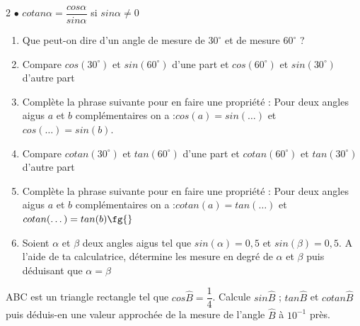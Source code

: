 \begin{multicols}{2}
{  		$\bullet$ $cotan\alpha=\dfrac{cos\alpha}{sin\alpha}$ si $sin\alpha\neq 0$
  	}
  	\begin{enumerate}
  		\item Que peut-on dire d'un angle de mesure de $ 30^\circ  $ et de mesure $ 60^\circ $ ?
  		\item Compare $cos(30^\circ) $ et $sin(60^\circ)  $ d'une part et $cos(60^\circ) $ et $sin(30^\circ)  $ d'autre part
  		\item Complète la phrase suivante pour en faire une propriété : \og Pour deux angles aigus $ a $ et $ b $ complémentaires on a :$cos(a) =sin(\dots)  $  et $cos( \dots ) =sin(b)  $. \fg{}
  		\item Compare $cotan(30^\circ) $ et $tan(60^\circ)  $ d'une part et $cotan(60^\circ) $ et $tan(30^\circ)  $ d'autre part
  		\item Complète la phrase suivante pour en faire une propriété : \og Pour deux angles aigus $ a $ et $ b $ complémentaires on a :$cotan(a) =tan(\dots)  $  et $cotan( \dots ) =tan(b)    \fg{}$
  		\item Soient $ \alpha $ et $ \beta $ deux angles aigus tel que $ sin(\alpha) =0,5$ et $ sin(\beta)=0,5 $. A l'aide de ta calculatrice, détermine les mesure en degré de $ \alpha
  		$ et $ \beta $ puis déduisant que $ \alpha=\beta $
  	\end{enumerate}
  	\dures
  	 
   
  	
  	ABC est un triangle rectangle tel que $cos\widehat{B}=\dfrac{1}{4}$. Calcule  $sin\widehat{B}$ ; $tan\widehat{B}$ et $cotan\widehat{B}$ puis déduis-en une valeur approchée de la mesure de l'angle $\widehat{B}$ à $10^{-1}$ près.
  	\\
  	\dures

  	\begin{center}
  	\end{center}
  	\begin{center}
  	\end{center}
  	

\end{multicols}
